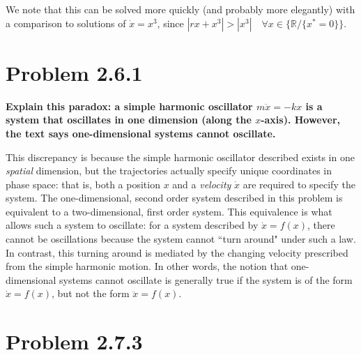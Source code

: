 \documentclass[draft]{agujournal2019}
\begin{document}
\par
We note that this can be solved more quickly (and probably more elegantly) with a comparison to solutions of $\dot x = x^3$, since $|rx + x^3| > |x^3| \quad  \forall x\in\{\mathbb{R}/\{x^*=0\}\}$.








\section{Problem 2.6.1}
\label{sec:p2}



\textbf{Explain this paradox: a simple harmonic oscillator $m \ddot x = -kx$ is a system that oscillates in one dimension (along the $x$-axis). However, the text says one-dimensional systems cannot oscillate.}
\par

This discrepancy is because the simple harmonic oscillator described exists in one \emph{spatial} dimension, but the trajectories actually specify unique coordinates in phase space: that is, both a position $x$ and a \emph{velocity} $\dot x$ are required to specify the system. The one-dimensional, second order system described in this problem is equivalent to a two-dimensional, first order system. This equivalence is what allows such a system to oscillate: for a system described by $\dot x = f(x)$, there cannot be oscillations because the system cannot ``turn around" under such a law. In contrast, this turning around is mediated by the changing velocity prescribed from the simple harmonic motion. In other words, the notion that one-dimensional systems cannot oscillate is generally true if the system is of the form $\dot x = f(x)$, but not the form $\ddot x = f(x)$.




\section{Problem 2.7.3}
\label{sec:p3}
\end{document}
